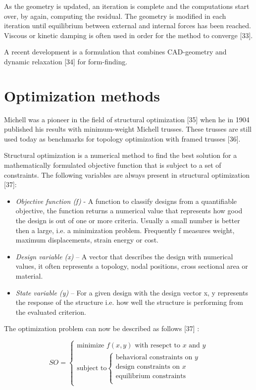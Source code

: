As the geometry is updated, an iteration is complete and the computations start over, by again, computing the residual. The geometry is modified in each iteration until equilibrium between external and internal forces has been reached. Viscous or kinetic damping is often used in order for the method to converge [33].

A recent development is a formulation that combines CAD-geometry and dynamic relaxation [34] for form-finding.

\section{Optimization methods}
Michell was a pioneer in the field of structural optimization [35] when he in 1904 published his results with minimum-weight Michell trusses. These trusses are still used today as benchmarks for topology optimization with framed trusses [36]. 

Structural optimization is a numerical method to find the best solution for a mathematically formulated objective function that is subject to a set of constraints. The following variables are always present in structural optimization [37]:

\begin{itemize} 
\item \textit{Objective function (f) }- A function to classify designs from a quantifiable objective, the function returns a numerical value that represents how good the design is out of one or more criteria. Usually a small number is better then a large, i.e. a minimization problem. Frequently f measures weight, maximum displacements, strain energy or cost.
\item \textit{Design variable (x)} – A vector that describes the design with numerical values, it often represents a topology, nodal positions, cross sectional area or material.
\item \textit{State variable (y)} – For a given design with the design vector x, y represents the response of the structure i.e. how well the structure is performing from the evaluated criterion.
\end{itemize} 

The optimization problem can now be described as follows [37] :

\begin{equation}
SO=\begin{cases}
    \textrm{minimize } f(x,y) \textrm{ with resepct to } x \textrm{ and } y \\
    {\textrm{subject to} \begin{cases}
        \textrm{behavioral constraints on } y\\
        \textrm{design constraints on } x\\
	\textrm{equilibrium constraints} \\
    \end{cases}}
      \end{cases}
    \end{equation} 


